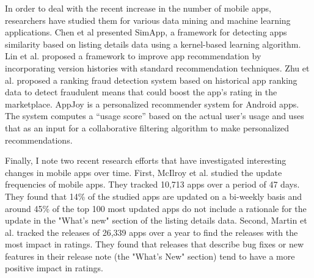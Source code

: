 In order to deal with the recent increase in the number of mobile apps, researchers have studied them for various data mining and machine learning applications.
Chen et al \cite{Chen_2015_WSDM} presented SimApp, a framework for detecting apps similarity based on listing details data using a kernel-based learning algorithm.
Lin et al. \cite{lin_2014_SIGIR} proposed a framework to improve app  recommendation by incorporating version histories with standard recommendation techniques.
Zhu et al. \cite{zhu_2013_CIKM} proposed a ranking fraud detection system based on historical app ranking data to detect fraudulent means that could boost the app's rating in the marketplace.
AppJoy \cite{yan_2011_MobiSys} is a personalized recommender system for Android apps.
The system computes a ``usage score'' based on the actual user's usage and uses that as an input for a collaborative filtering algorithm to make personalized recommendations.

Finally, I note two recent research efforts that have investigated interesting changes in mobile apps over time.
First, McIlroy et al. \cite{McIlroy2016} studied the update frequencies of mobile apps.
They tracked 10,713 apps over a period of 47 days.
They found that 14\% of the studied apps are updated on a bi-weekly basis and around 45\% of the top 100 most updated apps do not include a rationale for the update in the "What's new" section of the listing details data.
Second, Martin et al. \cite{Martin_FSE_2016} tracked the releases of 26,339 apps over a year to find the releases with the most impact in ratings.
They found that releases that describe bug fixes or new features in their release note (the "What's New" section) tend to have a more positive impact in ratings.

